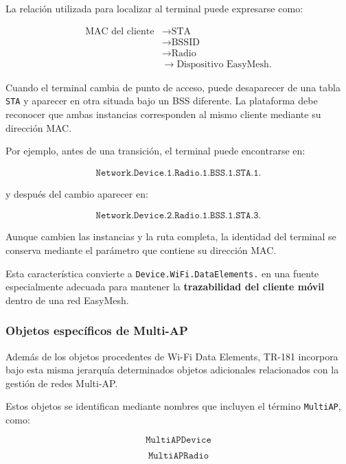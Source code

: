 La relación utilizada para localizar al terminal puede expresarse como:

\[
\begin{aligned}
    \text{MAC del cliente}
    &\longrightarrow \text{STA}\\
    &\longrightarrow \text{BSSID}\\
    &\longrightarrow \text{Radio}\\
    &\longrightarrow \text{Dispositivo EasyMesh}.
\end{aligned}
\]

Cuando el terminal cambia de punto de acceso, puede desaparecer de una
tabla \texttt{STA} y aparecer en otra situada bajo un BSS diferente. La
plataforma debe reconocer que ambas instancias corresponden al mismo
cliente mediante su dirección MAC.

Por ejemplo, antes de una transición, el terminal puede encontrarse en:

\[
\begin{split}
    \texttt{Network.Device.1.Radio.1.BSS.1.STA.1.}
\end{split}
\]

y después del cambio aparecer en:

\[
\begin{split}
    \texttt{Network.Device.2.Radio.1.BSS.1.STA.3.}
\end{split}
\]

Aunque cambien las instancias y la ruta completa, la identidad del
terminal se conserva mediante el parámetro que contiene su dirección
MAC.

Esta característica convierte a
\texttt{Device.WiFi.DataElements.} en una fuente especialmente adecuada
para mantener la \textbf{trazabilidad del cliente móvil} dentro de una
red EasyMesh.


\subsubsection*{Objetos específicos de Multi-AP}

Además de los objetos procedentes de Wi-Fi Data Elements, TR-181
incorpora bajo esta misma jerarquía determinados objetos adicionales
relacionados con la gestión de redes Multi-AP.

Estos objetos se identifican mediante nombres que incluyen el término
\texttt{MultiAP}, como:

\[
    \texttt{MultiAPDevice}
\]

\[
    \texttt{MultiAPRadio}
\]

